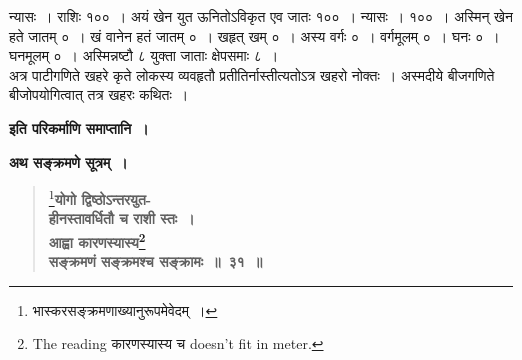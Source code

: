 \documentclass[11pt, openany]{book}
\begin{document}
न्यासः~। राशिः १००~। अयं खेन युत ऊनितोऽविकृत एव जातः १००~। न्यासः~। १००~। अस्मिन् खेन हते जातम् ०~। खं वानेन हतं जातम् ०~। खहृत् खम् ०~। अस्य वर्गः ०~। वर्गमूलम् ०~। घनः ०~। घनमूलम् ०~। अस्मिन्नष्टौ ८ युक्ता जाताः क्षेपसमाः ८~।\\

अत्र पाटीगणिते खहरे कृते लोकस्य व्यवहृतौ प्रतीतिर्नास्तीत्यतोऽत्र खहरो नोक्तः~। अस्मदीये बीजगणिते बीजोपयोगित्वात् तत्र खहरः कथितः~।

\begin{center}
\textbf{इति परिकर्माणि समाप्तानि~।}\\
\vspace{8mm}

{\Large \textbf{अथ सङ्क्रमणे सूत्रम्~।}}
\end{center}
\vspace{-3mm}

 \label{1.31}
\begin{quote}
\renewcommand{\thefootnote}{२}\footnote{भास्करसङ्क्रमणाख्यानुरूपमेवेदम्~।}{\large \textbf{{\color{purple}योगो द्विष्ठोऽन्तरयुत-\\
हीनस्तावर्धितौ च राशी स्तः~।\\ 
आह्वा कारणस्यास्य\renewcommand{\thefootnote}{३}\footnote{The reading कारणस्यास्य च doesn’t fit in meter.} \\
सङ्क्रमणं सङ्क्रमश्च सङ्क्रामः~॥~३१~॥}}}
\end{quote}

\newpage
\end{document}
